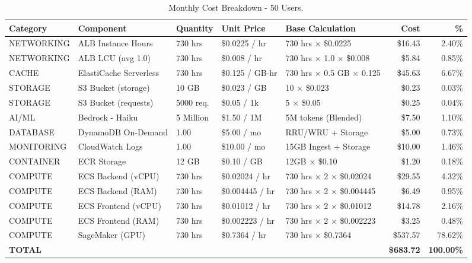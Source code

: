 \begin{table}[H]
    \centering
    \caption{Monthly Cost Breakdown - 50 Users.}
    \label{tab:monthly_cost_breakdown}
    \begin{adjustbox}{max width=\linewidth}
    \begin{tabular}{llp{1.6cm}p{2.7cm}p{4.4cm}rr}
        \toprule
        \textbf{Category} & \textbf{Component} & \textbf{Quantity} & \textbf{Unit Price} & \textbf{Base Calculation} & \textbf{Cost} & \textbf{\%} \\
        \midrule
        NETWORKING & ALB Instance Hours & 730 hrs & \$0.0225 / hr & 730 hrs $\times$ \$0.0225 & \$16.43 & 2.40\% \\
        NETWORKING & ALB LCU (avg 1.0) & 730 hrs & \$0.008 / hr & 730 hrs $\times$ 1.0 $\times$ \$0.008 & \$5.84 & 0.85\% \\
        CACHE & ElastiCache Serverless & 730 hrs & \$0.125 / GB-hr & 730 hrs $\times$ 0.5 GB $\times$ 0.125 & \$45.63 & 6.67\% \\
        STORAGE & S3 Bucket (storage) & 10 GB & \$0.023 / GB & 10 $\times$ \$0.023 & \$0.23 & 0.03\% \\
        STORAGE & S3 Bucket (requests) & 5000 req. & \$0.05 / 1k & 5 $\times$ \$0.05 & \$0.25 & 0.04\% \\
        AI/ML & Bedrock - Haiku & 5 Million & \$1.50 / 1M & 5M tokens (Blended) & \$7.50 & 1.10\% \\
        DATABASE & DynamoDB On-Demand & 1.00 & \$5.00 / mo & RRU/WRU + Storage & \$5.00 & 0.73\% \\
        MONITORING & CloudWatch Logs & 1.00 & \$10.00 / mo & 15GB Ingest + Storage & \$10.00 & 1.46\% \\
        CONTAINER & ECR Storage & 12 GB & \$0.10 / GB & 12GB $\times$ \$0.10 & \$1.20 & 0.18\% \\
        COMPUTE & ECS Backend (vCPU) & 730 hrs & \$0.02024 / hr & 730 hrs $\times$ 2 $\times$ \$0.02024 & \$29.55 & 4.32\% \\
        COMPUTE & ECS Backend (RAM) & 730 hrs & \$0.004445 / hr & 730 hrs $\times$ 2 $\times$ \$0.004445 & \$6.49 & 0.95\% \\
        COMPUTE & ECS Frontend (vCPU) & 730 hrs & \$0.01012 / hr & 730 hrs $\times$ 2 $\times$ \$0.01012 & \$14.78 & 2.16\% \\
        COMPUTE & ECS Frontend (RAM) & 730 hrs & \$0.002223 / hr & 730 hrs $\times$ 2 $\times$ \$0.002223 & \$3.25 & 0.48\% \\
        COMPUTE & SageMaker (GPU) & 730 hrs & \$0.7364 / hr & 730 hrs $\times$ \$0.7364 & \$537.57 & 78.62\% \\
        \midrule
        \textbf{TOTAL} & & & & & \textbf{\$683.72} & \textbf{100.00\%} \\
        \bottomrule
    \end{tabular}
\end{adjustbox}
\end{table}

